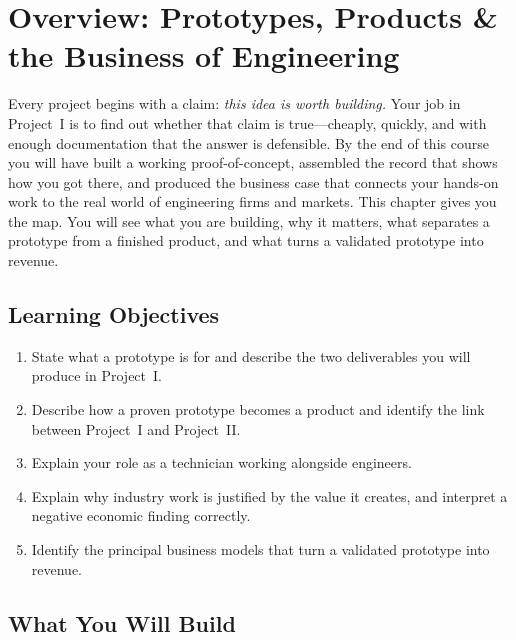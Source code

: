 
\chapter{Overview: Prototypes, Products \& the Business of Engineering}
\label{ch:overview}

Every project begins with a claim: \emph{this idea is worth building.}
Your job in Project~I is to find out whether that claim is true---cheaply,
quickly, and with enough documentation that the answer is defensible.
By the end of this course you will have built a working proof-of-concept,
assembled the record that shows how you got there, and produced the
business case that connects your hands-on work to the real world of
engineering firms and markets.
This chapter gives you the map.
You will see what you are building, why it matters, what separates a
prototype from a finished product, and what turns a validated prototype
into revenue.

\section*{Learning Objectives}
\begin{enumerate}
  \item State what a prototype is for and describe the two deliverables
        you will produce in Project~I.
  \item Describe how a proven prototype becomes a product and identify
        the link between Project~I and Project~II.
  \item Explain your role as a technician working alongside engineers.
  \item Explain why industry work is justified by the value it creates,
        and interpret a negative economic finding correctly.
  \item Identify the principal business models that turn a validated
        prototype into revenue.
\end{enumerate}

\section{What You Will Build}
\label{sec:ch1-what-you-build}

